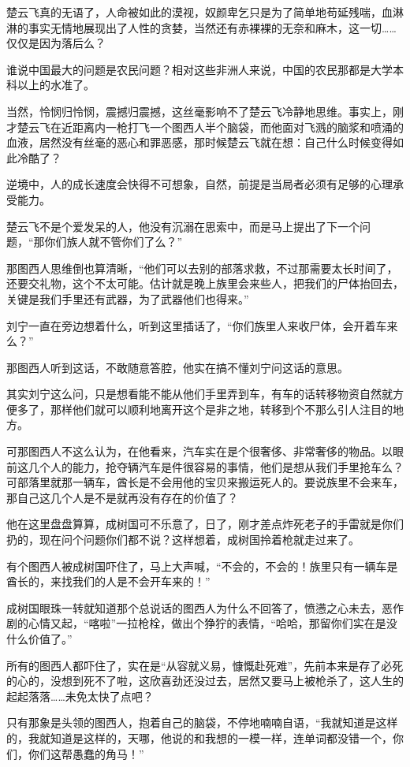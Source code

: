 楚云飞真的无语了，人命被如此的漠视，奴颜卑乞只是为了简单地苟延残喘，血淋淋的事实无情地展现出了人性的贪婪，当然还有赤裸裸的无奈和麻木，这一切……仅仅是因为落后么？

谁说中国最大的问题是农民问题？相对这些非洲人来说，中国的农民那都是大学本科以上的水准了。

当然，怜悯归怜悯，震撼归震撼，这丝毫影响不了楚云飞冷静地思维。事实上，刚才楚云飞在近距离内一枪打飞一个图西人半个脑袋，而他面对飞溅的脑浆和喷涌的血液，居然没有丝毫的恶心和罪恶感，那时候楚云飞就在想：自己什么时候变得如此冷酷了？

逆境中，人的成长速度会快得不可想象，自然，前提是当局者必须有足够的心理承受能力。

楚云飞不是个爱发呆的人，他没有沉溺在思索中，而是马上提出了下一个问题，“那你们族人就不管你们了么？”

那图西人思维倒也算清晰，“他们可以去别的部落求救，不过那需要太长时间了，还要交礼物，这个不太可能。估计就是晚上族里会来些人，把我们的尸体抬回去，关键是我们手里还有武器，为了武器他们也得来。”

刘宁一直在旁边想着什么，听到这里插话了，“你们族里人来收尸体，会开着车来么？”

那图西人听到这话，不敢随意答腔，他实在搞不懂刘宁问这话的意思。

其实刘宁这么问，只是想看能不能从他们手里弄到车，有车的话转移物资自然就方便多了，那样他们就可以顺利地离开这个是非之地，转移到个不那么引人注目的地方。

可那图西人不这么认为，在他看来，汽车实在是个很奢侈、非常奢侈的物品。以眼前这几个人的能力，抢夺辆汽车是件很容易的事情，他们是想从我们手里抢车么？可部落里就那一辆车，酋长是不会用他的宝贝来搬运死人的。要说族里不会来车，那自己这几个人是不是就再没有存在的价值了？

他在这里盘盘算算，成树国可不乐意了，日了，刚才差点炸死老子的手雷就是你们扔的，现在问个问题你们都不说？这样想着，成树国拎着枪就走过来了。

有个图西人被成树国吓住了，马上大声喊，“不会的，不会的！族里只有一辆车是酋长的，来找我们的人是不会开车来的！”

成树国眼珠一转就知道那个总说话的图西人为什么不回答了，愤懑之心未去，恶作剧的心情又起，“喀啦”一拉枪栓，做出个狰狞的表情，“哈哈，那留你们实在是没什么价值了。”

所有的图西人都吓住了，实在是“从容就义易，慷慨赴死难”，先前本来是存了必死的心的，没想到死不了啦，这欣喜劲还没过去，居然又要马上被枪杀了，这人生的起起落落……未免太快了点吧？

只有那象是头领的图西人，抱着自己的脑袋，不停地喃喃自语，“我就知道是这样的，我就知道是这样的，天哪，他说的和我想的一模一样，连单词都没错一个，你们，你们这帮愚蠢的角马！”

